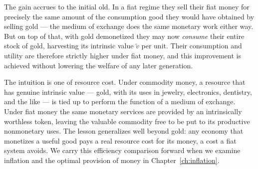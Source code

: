 
The gain accrues to the initial old. In a fiat regime they sell their fiat money for precisely the same amount of the consumption good they would have obtained by selling gold --- the medium of exchange does the same monetary work either way. But on top of that, with gold demonetized they may now \emph{consume} their entire stock of gold, harvesting its intrinsic value $\tilde v$ per unit. Their consumption and utility are therefore strictly higher under fiat money, and this improvement is achieved without lowering the welfare of any later generation.

The intuition is one of resource cost. Under commodity money, a resource that has genuine intrinsic value --- gold, with its uses in jewelry, electronics, dentistry, and the like --- is tied up to perform the function of a medium of exchange. Under fiat money the same monetary services are provided by an intrinsically worthless token, leaving the valuable commodity free to be put to its productive nonmonetary uses. The lesson generalizes well beyond gold: any economy that monetizes a useful good pays a real resource cost for its money, a cost a fiat system avoids. We carry this efficiency comparison forward when we examine inflation and the optimal provision of money in Chapter~\ref{ch:inflation}.
